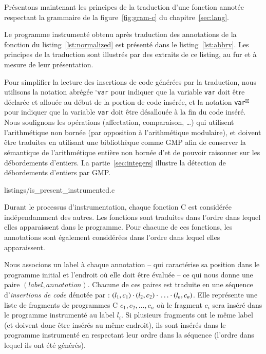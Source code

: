 Présentons maintenant les principes de la traduction d'une fonction annotée
respectant la grammaire de la figure~\ref{fig:gram-c} du
chapitre~\ref{sec:lang}.

Le programme instrumenté obtenu après traduction des annotations de la fonction
du listing~\ref{lst:normalized} est présenté dans le listing~\ref{lst:abbrv}.
Les principes de la traduction sont illustrés par des extraits de ce listing,
au fur et à mesure de leur présentation.

Pour simplifier la lecture des insertions de code générées par la traduction,
nous utilisons la notation abrégée ${}^{\square}$\lstinline{var} pour indiquer
que la variable \lstinline{var} doit être déclarée et allouée
au début de la portion de code insérée, et la notation
\lstinline{var}${}^{\boxtimes}$ pour indiquer que la variable \lstinline{var} doit
être désallouée à la fin du code inséré.
Nous soulignons les opérations (affectation, comparaison, \dots) qui utilisent
l'arithmétique non bornée (par opposition à l'arithmétique modulaire), et
doivent être traduites en utilisant une bibliothèque comme GMP afin de conserver
la sémantique de l'arithmétique entière non bornée d'\eacsl et de pouvoir
raisonner sur les débordements d'entiers.
La partie~\ref{sec:integers} illustre la détection de débordements d'entiers par
GMP.



                {listings/is_present_instrumented.c}


Durant le processus d'instrumentation, chaque fonction C est considérée
indépendamment des autres.
Les fonctions sont traduites dans l'ordre dans lequel elles apparaissent dans le
programme.
Pour chacune de ces fonctions, les annotations \eacsl sont également considérées
dans l'ordre dans lequel elles apparaissent.

Nous associons un label à chaque annotation -- qui caractérise sa position dans
le programme initial et l'endroit où elle doit être évaluée -- ce qui nous
donne une paire $(label, annotation)$.
Chacune de ces paires est traduite en une séquence
d'\emph{insertions de code} dénotée par :
$(l_1, c_1) \cdot{} (l_2, c_2) \cdot{} \ldots \cdot{} (l_n, c_n)$.
Elle représente une liste de fragments de programmes C $c_1, c_2, \ldots, c_n$
où le fragment $c_i$ sera inséré dans le programme instrumenté au label $l_i$.
Si plusieurs fragments ont le même label (et doivent donc être insérés au
même endroit), ils sont insérés dans le programme instrumenté en respectant leur
ordre dans la séquence (l'ordre dans lequel ils ont été générés).

